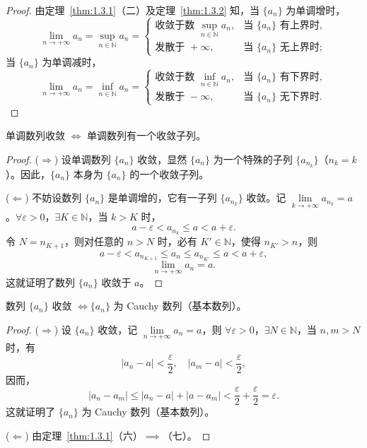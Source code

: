 \begin{proof}
由定理~\ref{thm:1.3.1}（二）及定理~\ref{thm:1.3.2} 知，当 $\{a_n\}$ 为单调增时，
\[
\lim_{n\to+\infty} a_n = \sup_{n\in\mathbb{N}} a_n = \begin{cases}
\text{收敛于数 }\sup\limits_{n\in\mathbb{N}} a_n, & \text{当 }\{a_n\}\text{ 有上界时}, \\
\text{发散于 }+\infty, & \text{当 }\{a_n\}\text{ 无上界时};
\end{cases}
\]
当 $\{a_n\}$ 为单调减时，
\[
\lim_{n\to+\infty} a_n = \inf_{n\in\mathbb{N}} a_n = \begin{cases}
\text{收敛于数 }\inf\limits_{n\in\mathbb{N}} a_n, & \text{当 }\{a_n\}\text{ 有下界时}, \\
\text{发散于 }-\infty, & \text{当 }\{a_n\}\text{ 无下界时}.
\end{cases}
\]
\end{proof}

\begin{corollary}\label{cor:1.3.2}
单调数列收敛 $\iff$ 单调数列有一个收敛子列。
\end{corollary}

\begin{proof}
($\Rightarrow$) 设单调数列 $\{a_n\}$ 收敛，显然 $\{a_n\}$ 为一个特殊的子列 $\{a_{n_k}\}$（$n_k = k$）。因此，$\{a_n\}$ 本身为 $\{a_n\}$ 的一个收敛子列。

($\Leftarrow$) 不妨设数列 $\{a_n\}$ 是单调增的，它有一子列 $\{a_{n_k}\}$ 收敛。记 $\lim\limits_{k\to+\infty} a_{n_k} = a$。$\forall \varepsilon > 0$，$\exists K \in \mathbb{N}$，当 $k > K$ 时，
\[
a - \varepsilon < a_{n_k} \leqslant a < a + \varepsilon.
\]
令 $N = n_{K+1}$，则对任意的 $n > N$ 时，必有 $K' \in \mathbb{N}$，使得 $n_{K'} > n$，则
\[
a - \varepsilon < a_{n_{K+1}} \leqslant a_n \leqslant a_{n_{K'}} \leqslant a < a + \varepsilon,
\]
\[
\lim_{n\to+\infty} a_n = a.
\]
这就证明了数列 $\{a_n\}$ 收敛于 $a$。
\end{proof}

\begin{theorem}\label{thm:1.3.3}
数列 $\{a_n\}$ 收敛 $\iff \{a_n\}$ 为 Cauchy 数列（基本数列）。
\end{theorem}

\begin{proof}
($\Rightarrow$) 设 $\{a_n\}$ 收敛，记 $\lim\limits_{n\to+\infty} a_n = a$，则 $\forall \varepsilon > 0$，$\exists N \in \mathbb{N}$，当 $n, m > N$ 时，有
\[
|a_n - a| < \frac{\varepsilon}{2},\quad |a_m - a| < \frac{\varepsilon}{2},
\]
因而，
\[
|a_n - a_m| \leqslant |a_n - a| + |a - a_m| < \frac{\varepsilon}{2} + \frac{\varepsilon}{2} = \varepsilon.
\]
这就证明了 $\{a_n\}$ 为 Cauchy 数列（基本数列）。

($\Leftarrow$) 由定理~\ref{thm:1.3.1}（六）$\implies$（七）。
\end{proof}

